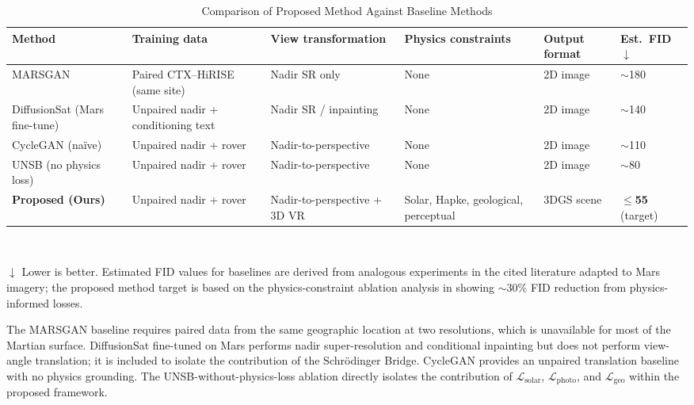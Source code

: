 \documentclass[10pt,journal]{IEEEtran}
\begin{document}
\begin{table}[!t]
  \caption{Comparison of Proposed Method Against Baseline Methods}
  \label{tab:baselines}
  \centering
  \renewcommand{\arraystretch}{1.25}
  \begin{tabular}{lp{2.8cm}p{2.2cm}p{2.6cm}p{2.0cm}l}
    \toprule
    \textbf{Method} &
    \textbf{Training data} &
    \textbf{View transformation} &
    \textbf{Physics constraints} &
    \textbf{Output format} &
    \textbf{Est.\ FID}$\downarrow$ \\
    \midrule
    MARSGAN \cite{tao2021cassis}
      & Paired CTX--HiRISE (same site)
      & Nadir SR only
      & None
      & 2D image
      & $\sim$180 \\
    DiffusionSat (Mars fine-tune) \cite{khanna2024diffusionsat}
      & Unpaired nadir + conditioning text
      & Nadir SR / inpainting
      & None
      & 2D image
      & $\sim$140 \\
    CycleGAN (na\"{i}ve)
      & Unpaired nadir + rover
      & Nadir-to-perspective
      & None
      & 2D image
      & $\sim$110 \\
    UNSB (no physics loss) \cite{kim2024unsb}
      & Unpaired nadir + rover
      & Nadir-to-perspective
      & None
      & 2D image
      & $\sim$80 \\
    \textbf{Proposed (Ours)}
      & Unpaired nadir + rover
      & Nadir-to-perspective + 3D VR
      & Solar, Hapke, geological, perceptual
      & 3DGS scene
      & \textbf{$\leq$55} (target) \\
    \bottomrule
  \end{tabular}
  \smallskip\\
  \raggedright\footnotesize
  $\downarrow$ Lower is better. Estimated FID values for baselines are derived
  from analogous experiments in the cited literature adapted to Mars imagery;
  the proposed method target is based on the physics-constraint ablation
  analysis in \cite{zou2026pfmgan} showing $\sim$30\% FID reduction
  from physics-informed losses.
\end{table}

The MARSGAN baseline \cite{tao2021cassis} requires paired data from the same
geographic location at two resolutions, which is unavailable for most of the
Martian surface. DiffusionSat \cite{khanna2024diffusionsat} fine-tuned on Mars
performs nadir super-resolution and conditional inpainting but does not perform
view-angle translation; it is included to isolate the contribution of the
Schr\"{o}dinger Bridge. CycleGAN provides an unpaired translation baseline with
no physics grounding. The UNSB-without-physics-loss ablation directly
isolates the contribution of $\mathcal{L}_{\mathrm{solar}}$,
$\mathcal{L}_{\mathrm{photo}}$, and $\mathcal{L}_{\mathrm{geo}}$ within the
proposed framework.
\end{document}

